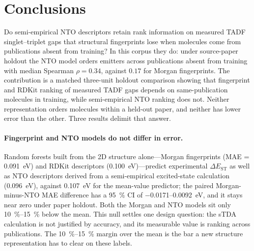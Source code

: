 
\section{Conclusions}\label{sec:conclusions}

Do semi-empirical NTO descriptors retain rank information on measured TADF
singlet--triplet gaps that structural fingerprints lose when molecules come from
publications absent from training? In this corpus they do: under source-paper
holdout the NTO model orders emitters across publications absent from training with
median Spearman $\rho = 0.34$, against $0.17$ for Morgan fingerprints. The
contribution is a matched three-unit holdout comparison showing that fingerprint
and RDKit ranking of measured TADF gaps depends on same-publication molecules in
training, while semi-empirical NTO ranking does not. Neither representation orders
molecules within a held-out paper, and neither has lower error than the other.
Three results delimit that answer.

\paragraph{Fingerprint and NTO models do not differ in error.}
Random forests built from the 2D structure alone---Morgan fingerprints
(MAE = \qty{0.091}{\electronvolt}) and RDKit descriptors
(\qty{0.100}{\electronvolt})---predict experimental $\Delta E_\text{ST}$ as well
as NTO descriptors derived from a semi-empirical excited-state calculation
(\qty{0.096}{\electronvolt}), against \qty{0.107}{\electronvolt} for the mean-value
predictor; the paired Morgan-minus-NTO MAE difference has a \qty{95}{\percent} CI of
\numrange{-0.0171}{+0.0092}~eV, and it stays near zero under paper holdout. Both
the Morgan and NTO models sit only \qtyrange{10}{15}{\percent} below the mean. This
null settles one design question: the sTDA calculation is not justified by
accuracy, and its measurable value is ranking across publications. The
\qtyrange{10}{15}{\percent} margin over the mean is the bar a new structure
representation has to clear on these labels.

